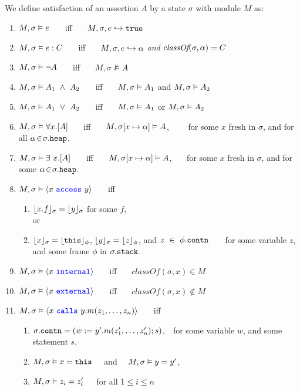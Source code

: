 \begin{definition} 
\label{def:chainmail-semantics}
We define satisfaction of an assertion $A$ by a %
state $\sigma$ with 
 module $M$ as:
\begin{enumerate}
\item
\label{cExpr}
$M , \sigma \vDash e$ \ \ \ iff \ \ \  $M, \sigma, e \hookrightarrow \texttt{true}$
\item
\label{cClass}
$M , \sigma \vDash e : C$ \ \ \ iff \ \ \  $M, \sigma, e \hookrightarrow \alpha$ \textit{and} $\textit{classOf}(\sigma, \alpha) = C$
\item
$M , \sigma \vDash \neg A$ \ \ \ iff \ \ \  ${M},{\sigma}\nvDash{A}$
\item
$\satisfiesA{M}{\sigma}{A_1\ \wedge\ A_2}$ \ \ \ iff \ \ \  $M , \sigma \vDash A_1$ and 
$M , \sigma \vDash A_2$
\item
$\satisfiesA{M}{\sigma}{A_1\ \vee\ A_2}$ \ \ \ iff \ \ \  $M , \sigma \vDash A_1$ or 
$M , \sigma \vDash A_2$
\item
$M , \sigma \vDash \forall x.[A]$ \ \ \ iff \ \ \  
$M , \sigma[x \mapsto \alpha] \vDash A$, \ 
\ \ \ for some $x$ fresh in $\sigma$, and for all $\alpha\!\in\!\sigma.{\texttt{heap}}$.
\item
$M , \sigma \vDash \exists\ x.[A]$ \ \ \ iff \ \ \  
$M , \sigma[x \mapsto \alpha] \vDash A$, \ 
\ \ for some $x$ fresh in $\sigma$, and for some $ \alpha\!\in\!\sigma.{\texttt{heap}}$. 
\item
\label{cAccess}
$M , \sigma \vDash \langle x\ {\color{blue}\texttt{access}}\ y \rangle$ \ \ \ iff \ \ \  
\begin{enumerate}
\item
\label{c1}
$\lfloor x.f \rfloor_{\sigma}={\lfloor y \rfloor_{\sigma}}$ for some $f$, \\
  or
\item
\label{c2}
{$\lfloor x \rfloor_{\sigma}=\lfloor {\texttt{this}} \rfloor_{\phi}$}, {$\lfloor y \rfloor_{\sigma}=\lfloor z \rfloor_{\phi}$}, and $z\ \in\ \phi.{\texttt{contn}}$\ \ \ \
for some variable $z$, and some frame $\phi$ in $\sigma.
{\texttt{stack}}$.
\end{enumerate}
\item
\label{cInternal}
$M , \sigma \vDash \langle x\ {\color{blue}\texttt{internal}}\rangle$ \ \ \ iff \ \ \  
$\textit{classOf}(\sigma,x) \in M$
\item
\label{cExternal}
$M , \sigma \vDash \langle x\ {\color{blue}\texttt{external}}\rangle$ \ \ \ iff \ \ \  
$\textit{classOf}(\sigma,x) \not\in M$
\item
\label{cCall}
$M , \sigma \vDash \langle x\ {\color{blue}\texttt{calls}}\ y.m(z_1, \ldots, z_n) \rangle$ \ \ \ iff \ \ \ 
\begin{enumerate}
\item
$\sigma.{\texttt{contn}} = (w := y'.m(z'_1,\ldots,z'_n); s)$,\ \ for some 
variable $w$, and some statement $s$,
\item
$M , \sigma \vDash x = {\texttt{this}}$
\ \ and \ \ 
$M , \sigma \vDash y = y'$,
\item
$M , \sigma \vDash z_i = z'_i$\ \ \ for all $1\!\leq i\!\leq n$
\end{enumerate}
\end{enumerate}
\end{definition}

